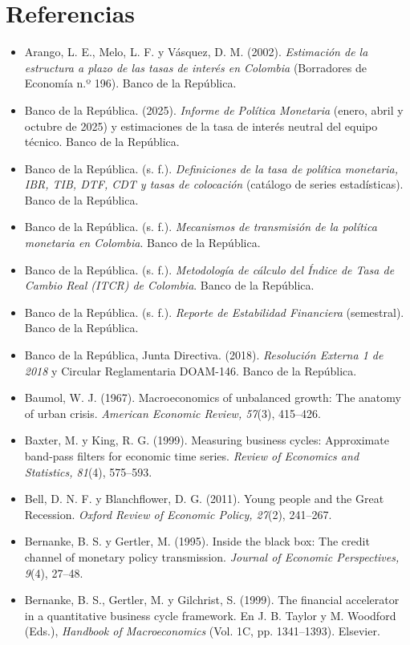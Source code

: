 \chapter{Referencias}
\label{es:r:referencias}
\begin{itemize}[leftmargin=1.2em,itemindent=-1.2em]
\small
\item[] Arango, L. E., Melo, L. F. y Vásquez, D. M. (2002). \emph{Estimación de la estructura a plazo de las tasas de interés en Colombia} (Borradores de Economía n.º 196). Banco de la República.
\item[] Banco de la República. (2025). \emph{Informe de Política Monetaria} (enero, abril y octubre de 2025) y estimaciones de la tasa de interés neutral del equipo técnico. Banco de la República.
\item[] Banco de la República. (s. f.). \emph{Definiciones de la tasa de política monetaria, IBR, TIB, DTF, CDT y tasas de colocación} (catálogo de series estadísticas). Banco de la República.
\item[] Banco de la República. (s. f.). \emph{Mecanismos de transmisión de la política monetaria en Colombia}. Banco de la República.
\item[] Banco de la República. (s. f.). \emph{Metodología de cálculo del Índice de Tasa de Cambio Real (ITCR) de Colombia}. Banco de la República.
\item[] Banco de la República. (s. f.). \emph{Reporte de Estabilidad Financiera} (semestral). Banco de la República.
\item[] Banco de la República, Junta Directiva. (2018). \emph{Resolución Externa 1 de 2018} y Circular Reglamentaria DOAM-146. Banco de la República.
\item[] Baumol, W. J. (1967). Macroeconomics of unbalanced growth: The anatomy of urban crisis. \emph{American Economic Review, 57}(3), 415–426.
\item[] Baxter, M. y King, R. G. (1999). Measuring business cycles: Approximate band-pass filters for economic time series. \emph{Review of Economics and Statistics, 81}(4), 575–593.
\item[] Bell, D. N. F. y Blanchflower, D. G. (2011). Young people and the Great Recession. \emph{Oxford Review of Economic Policy, 27}(2), 241–267.
\item[] Bernanke, B. S. y Gertler, M. (1995). Inside the black box: The credit channel of monetary policy transmission. \emph{Journal of Economic Perspectives, 9}(4), 27–48.
\item[] Bernanke, B. S., Gertler, M. y Gilchrist, S. (1999). The financial accelerator in a quantitative business cycle framework. En J. B. Taylor y M. Woodford (Eds.), \emph{Handbook of Macroeconomics} (Vol. 1C, pp. 1341–1393). Elsevier.

\end{itemize}
